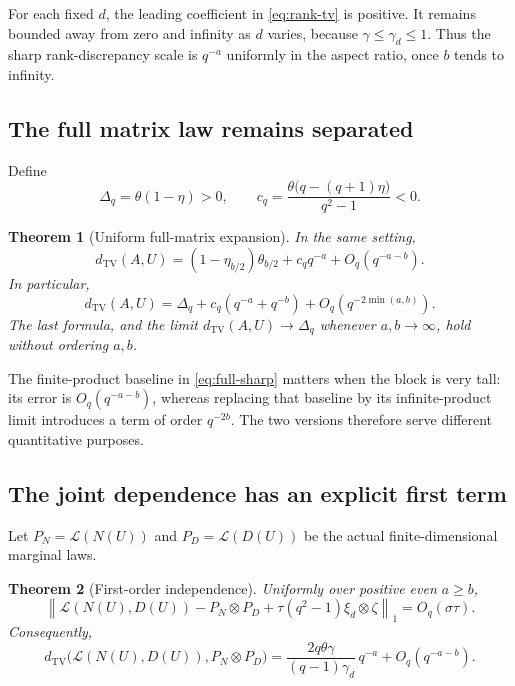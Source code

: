 \documentclass[11pt]{article}
\newtheorem{theorem}{Theorem}[section]
\theoremstyle{definition}
\theoremstyle{remark}
\newcommand{\Law}{\mathcal L}
\newcommand{\TV}{d_{\mathrm{TV}}}
\newcommand{\normone}[1]{\left\|#1\right\|_1}
\begin{document}
For each fixed $d$, the leading coefficient in \eqref{eq:rank-tv} is positive. It remains bounded away from zero and infinity as $d$ varies, because $\gamma\le\gamma_d\le1$. Thus the sharp rank-discrepancy scale is $q^{-a}$ uniformly in the aspect ratio, once $b$ tends to infinity.

\subsection{The full matrix law remains separated}

Define
\begin{equation}\label{eq:full-constants}
 \Delta_q=\theta(1-\eta)>0,\qquad
 c_q=\frac{\theta\bigl(q-(q+1)\eta\bigr)}{q^2-1}<0.
\end{equation}

\begin{theorem}[Uniform full-matrix expansion]\label{thm:full}
In the same setting,
\begin{equation}\label{eq:full-sharp}
 \TV(A,U)=(1-\eta_{b/2})\theta_{b/2}
       +c_q q^{-a}+O_q(q^{-a-b}).
\end{equation}
In particular,
\begin{equation}\label{eq:full-symmetric}
 \TV(A,U)=\Delta_q+c_q(q^{-a}+q^{-b})
       +O_q(q^{-2\min(a,b)}).
\end{equation}
The last formula, and the limit $\TV(A,U)\to\Delta_q$ whenever $a,b\to\infty$, hold without ordering $a,b$.
\end{theorem}

The finite-product baseline in \eqref{eq:full-sharp} matters when the block is very tall: its error is $O_q(q^{-a-b})$, whereas replacing that baseline by its infinite-product limit introduces a term of order $q^{-2b}$. The two versions therefore serve different quantitative purposes.

\subsection{The joint dependence has an explicit first term}

Let $P_N=\Law(N(U))$ and $P_D=\Law(D(U))$ be the actual finite-dimensional marginal laws.

\begin{theorem}[First-order independence]\label{thm:joint}
Uniformly over positive even $a\ge b$,
\begin{equation}\label{eq:joint-signed}
 \normone{\Law(N(U),D(U))-P_N\otimes P_D
       +\tau(q^2-1)\xi_d\otimes\zeta}
 =O_q(\sigma\tau).
\end{equation}
Consequently,
\begin{equation}\label{eq:joint-tv}
 \TV\bigl(\Law(N(U),D(U)),P_N\otimes P_D\bigr)
 =\frac{2q\theta\gamma}{(q-1)\gamma_d}\,q^{-a}
       +O_q(q^{-a-b}).
\end{equation}
\end{theorem}
\end{document}
